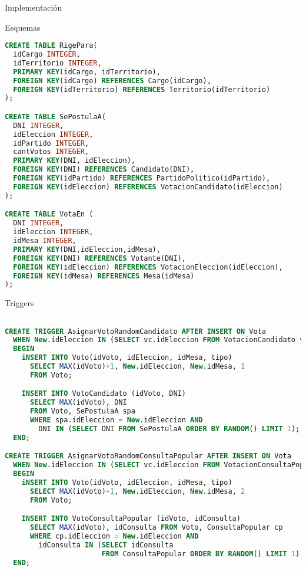 \begin{section}{Implementaci\'on}
\begin{subsection}{Esquemas}
\begin{lstlisting}[language=SQL, basicstyle=\footnotesize]
CREATE TABLE RigePara(
  idCargo INTEGER,
  idTerritorio INTEGER,
  PRIMARY KEY(idCargo, idTerritorio),
  FOREIGN KEY(idCargo) REFERENCES Cargo(idCargo),
  FOREIGN KEY(idTerritorio) REFERENCES Territorio(idTerritorio)
);

CREATE TABLE SePostulaA(
  DNI INTEGER,
  idEleccion INTEGER,
  idPartido INTEGER,
  cantVotos INTEGER,
  PRIMARY KEY(DNI, idEleccion),
  FOREIGN KEY(DNI) REFERENCES Candidato(DNI),
  FOREIGN KEY(idPartido) REFERENCES PartidoPolitico(idPartido),
  FOREIGN KEY(idEleccion) REFERENCES VotacionCandidato(idEleccion)
);

CREATE TABLE VotaEn (
  DNI INTEGER, 
  idEleccion INTEGER, 
  idMesa INTEGER,   
  PRIMARY KEY(DNI,idEleccion,idMesa), 
  FOREIGN KEY(DNI) REFERENCES Votante(DNI), 
  FOREIGN KEY(idEleccion) REFERENCES VotacionEleccion(idEleccion), 
  FOREIGN KEY(idMesa) REFERENCES Mesa(idMesa)
);

\end{lstlisting} 
\end{subsection}

\begin{subsection}{Triggers}

\begin{lstlisting}[language=SQL, basicstyle=\footnotesize]

CREATE TRIGGER AsignarVotoRandomCandidato AFTER INSERT ON Vota
  WHEN New.idEleccion IN (SELECT vc.idEleccion FROM VotacionCandidato vc)
  BEGIN       
    iNSERT INTO Voto(idVoto, idEleccion, idMesa, tipo) 
      SELECT MAX(idVoto)+1, New.idEleccion, New.idMesa, 1
      FROM Voto;

    INSERT INTO VotoCandidato (idVoto, DNI)       
      SELECT MAX(idVoto), DNI 
      FROM Voto, SePostulaA spa
      WHERE spa.idEleccion = New.idEleccion AND 
        DNI IN (SELECT DNI FROM SePostulaA ORDER BY RANDOM() LIMIT 1);
  END;

CREATE TRIGGER AsignarVotoRandomConsultaPopular AFTER INSERT ON Vota
  WHEN New.idEleccion IN (SELECT vc.idEleccion FROM VotacionConsultaPopular vc)
  BEGIN       
    iNSERT INTO Voto(idVoto, idEleccion, idMesa, tipo) 
      SELECT MAX(idVoto)+1, New.idEleccion, New.idMesa, 2 
      FROM Voto;

    INSERT INTO VotoConsultaPopular (idVoto, idConsulta) 
      SELECT MAX(idVoto), idConsulta FROM Voto, ConsultaPopular cp
      WHERE cp.idEleccion = New.idEleccion AND
        idConsulta IN (SELECT idConsulta
                       FROM ConsultaPopular ORDER BY RANDOM() LIMIT 1);
  END;


\end{lstlisting}
\end{subsection}
\end{section}
